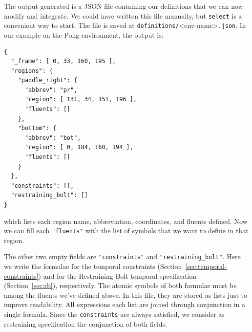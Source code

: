 The output generated is a JSON file containing our definitions that we can now
modify and integrate. We could have written this file manually, but
\texttt{select} is a convenient way to start. The file is saved at
\texttt{definitions/}<env-name>\texttt{.json}. In our example on the Pong
environment, the output is:
\begin{lstlisting}
{
  "_frame": [ 0, 33, 160, 195 ],
  "regions": {
    "paddle_right": {
      "abbrev": "pr",
      "region": [ 131, 34, 151, 196 ],
      "fluents": []
    },
    "bottom": {
      "abbrev": "bot",
      "region": [ 0, 184, 160, 194 ],
      "fluents": []
    }
  },
  "constraints": [],
  "restraining_bolt": []
}
\end{lstlisting}
which lists each region name, abbreviation, coordinates, and fluents defined.
Now we can fill each \verb|"fluents"| with the list of symbols that we want to
define in that region.

The other two empty fields are \verb|"constraints"| and
\verb|"restraining_bolt"|. Here we write the \ldl{} formulae for the temporal
constraints (Section~\ref{sec:temporal-constraints}) and for the Restraining
Bolt temporal specification (Section~\ref{sec:rb}), respectively. The atomic
symbols of both formulae must be among the fluents we've defined above. In
this file, they are stored as lists just to improve readability. All
expressions each list are joined through conjunction in a single \ldl{}
formula. Since the \texttt{constraints} are always satisfied, we consider as
restraining specification the conjunction of both fields.

